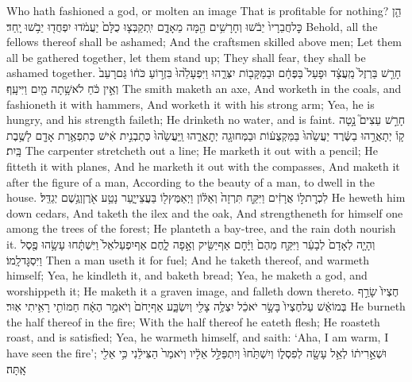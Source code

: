 {Who hath fashioned a god, or molten an image That is profitable for nothing?}
{הֵ֤ן כׇּל\maqqaf חֲבֵרָיו֙ יֵבֹ֔שׁוּ וְחָרָשִׁ֥ים הֵ֖מָּה מֵאָדָ֑ם יִֽתְקַבְּצ֤וּ כֻלָּם֙ יַעֲמֹ֔דוּ יִפְחֲד֖וּ יֵבֹ֥שׁוּ יָֽחַד׃}
{Behold, all the fellows thereof shall be ashamed; And the craftsmen skilled above men; Let them all be gathered together, let them stand up; They shall fear, they shall be ashamed together.}
{חָרַ֤שׁ בַּרְזֶל֙ מַֽעֲצָ֔ד וּפָעַל֙ בַּפֶּחָ֔ם וּבַמַּקָּב֖וֹת יִצְּרֵ֑הוּ וַיִּפְעָלֵ֙הוּ֙ בִּזְר֣וֹעַ כֹּח֔וֹ גַּם\maqqaf רָעֵב֙ וְאֵ֣ין כֹּ֔חַ לֹא\maqqaf שָׁ֥תָה מַ֖יִם וַיִּיעָֽף׃}
{The smith maketh an axe, And worketh in the coals, and fashioneth it with hammers, And worketh it with his strong arm; Yea, he is hungry, and his strength faileth; He drinketh no water, and is faint.}
{חָרַ֣שׁ עֵצִים֮ נָ֣טָה קָו֒ יְתָאֲרֵ֣הוּ בַשֶּׂ֔רֶד יַעֲשֵׂ֙הוּ֙ בַּמַּקְצֻע֔וֹת וּבַמְּחוּגָ֖ה יְתׇאֳרֵ֑הוּ וַֽיַּעֲשֵׂ֙הוּ֙ כְּתַבְנִ֣ית אִ֔ישׁ כְּתִפְאֶ֥רֶת אָדָ֖ם לָשֶׁ֥בֶת בָּֽיִת׃}
{The carpenter stretcheth out a line; He marketh it out with a pencil; He fitteth it with planes, And he marketh it out with the compasses, And maketh it after the figure of a man, According to the beauty of a man, to dwell in the house.}
{לִכְרׇת\maqqaf ל֣וֹ אֲרָזִ֔ים וַיִּקַּ֤ח תִּרְזָה֙ וְאַלּ֔וֹן וַיְאַמֶּץ\maqqaf ל֖וֹ בַּעֲצֵי\maqqaf יָ֑עַר נָטַ֥ע אֹ֖רֶ\small ן\normalsize  וְגֶ֥שֶׁם יְגַדֵּֽל׃}
{He heweth him down cedars, And taketh the ilex and the oak, And strengtheneth for himself one among the trees of the forest; He planteth a bay-tree, and the rain doth nourish it.}
{וְהָיָ֤ה לְאָדָם֙ לְבָעֵ֔ר וַיִּקַּ֤ח מֵהֶם֙ וַיָּ֔חׇם אַף\maqqaf יַשִּׂ֖יק וְאָ֣פָה לָ֑חֶם אַף\maqqaf יִפְעַל\maqqaf אֵל֙ וַיִּשְׁתָּ֔חוּ עָשָׂ֥הוּ פֶ֖סֶל וַיִּסְגׇּד\maqqaf לָֽמוֹ׃}
{Then a man useth it for fuel; And he taketh thereof, and warmeth himself; Yea, he kindleth it, and baketh bread; Yea, he maketh a god, and worshippeth it; He maketh it a graven image, and falleth down thereto.}
{חֶצְיוֹ֙ שָׂרַ֣ף בְּמוֹ\maqqaf אֵ֔שׁ עַל\maqqaf חֶצְיוֹ֙ בָּשָׂ֣ר יֹאכֵ֔ל יִצְלֶ֥ה צָלִ֖י וְיִשְׂבָּ֑ע אַף\maqqaf יָחֹם֙ וְיֹאמַ֣ר הֶאָ֔ח חַמּוֹתִ֖י רָאִ֥יתִי אֽוּר׃}
{He burneth the half thereof in the fire; With the half thereof he eateth flesh; He roasteth roast, and is satisfied; Yea, he warmeth himself, and saith: ‘Aha, I am warm, I have seen the fire’;}
{וּשְׁאֵ֣רִית֔וֹ לְאֵ֥ל עָשָׂ֖ה לְפִסְל֑וֹ  וְיִשְׁתַּ֙חוּ֙ וְיִתְפַּלֵּ֣ל אֵלָ֔יו וְיֹאמַר֙ הַצִּילֵ֔נִי כִּ֥י אֵלִ֖י אָֽתָּה׃}

